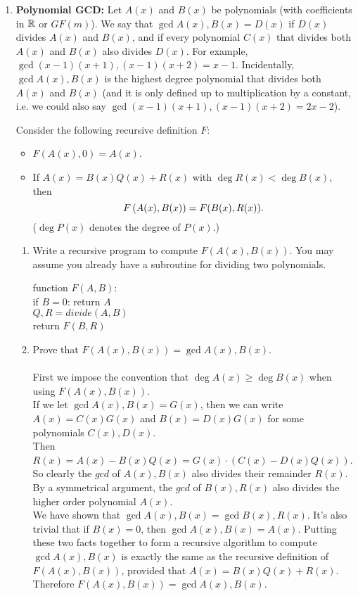 \documentclass[11pt,fleqn]{article}
\begin{document}
\begin{enumerate}

\item  \textbf{Polynomial GCD:}
Let $A(x)$ and $B(x)$ be polynomials (with coefficients in $\mathbb{R}$ or $GF(m)$). 
We say that  $\gcd{A(x), B(x)} = D(x)$ if $D(x)$ divides $A(x)$ and $B(x)$,
and if every polynomial $C(x)$ that divides both $A(x)$ and $B(x)$ also 
divides $D(x)$. 
For example, $\gcd{(x-1)(x+1), (x-1)(x+2)} = x-1$.
Incidentally, $\gcd{A(x), B(x)}$ is the highest degree polynomial
that divides both $A(x)$ and $B(x)$
(and it is only defined up to multiplication by a constant,
i.e. we could also say $\gcd{(x-1)(x+1), (x-1)(x+2)} = 2x-2$).

Consider the following recursive definition $F$:
\begin{itemize}
\item $F(A(x), 0) = A(x)$.
\item If $A(x) = B(x) Q(x) + R(x)$ with $\deg{R(x)} < \deg{B(x)}$, then
$$F\left(A(x), B(x)\right) = F(B(x), R(x)).$$ 
($\deg{P(x)}$ denotes the degree of $P(x)$.) 
\end{itemize}

\begin{enumerate}
\item Write a recursive program to compute $F(A(x),B(x))$. You may assume you already have a subroutine for dividing two polynomials.
\begin{tabbing}
function $F(A, B)$: \\
\hspace{1cm} if $B=0$: return $A$ \\
\hspace{1cm} $Q, R = divide(A, B)$ \\
\hspace{1cm} return $F(B, R)$
\end{tabbing}
\item Prove that $F(A(x), B(x)) = \gcd{A(x), B(x)}$. \\\\
First we impose the convention that $\deg{A(x)} \geq \deg{B(x)}$ when using $F(A(x), B(x))$.\\
If we let $\gcd{A(x), B(x)} = G(x)$, then we can write $A(x) = C(x)G(x)$ and $B(x) = D(x)G(x)$ for some polynomials $C(x),D(x)$. \\
Then $R(x) = A(x) - B(x)Q(x) = G(x) \cdot (C(x) - D(x)Q(x))$. So clearly the $gcd$ of $A(x), B(x)$ also divides their remainder $R(x)$. \\
By a symmetrical argument, the $gcd$ of $B(x), R(x)$ also divides the higher order polynomial $A(x)$. \\
We have shown that $\gcd{A(x), B(x)} = \gcd{B(x), R(x)}$. It's also trivial that if $B(x) = 0$, then $\gcd{A(x), B(x)} = A(x)$. Putting these two facts together to form a recursive algorithm to compute $\gcd{A(x), B(x)}$ is exactly the same as the recursive definition of $F(A(x), B(x))$, provided that $A(x) = B(x)Q(x) + R(x)$. Therefore $F(A(x), B(x)) = \gcd{A(x), B(x)}$.
\end{enumerate}


\end{enumerate}
\end{document}
